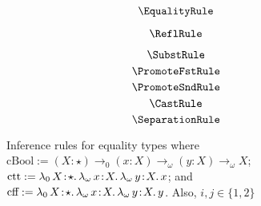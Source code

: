 
\begin{figure}
    \centering
    \begin{minipage}{0.5\textwidth}
        $$\EqualityRule$$
    \end{minipage}%
    \begin{minipage}{0.5\textwidth}
        $$\ReflRule$$
    \end{minipage}%
    $$\SubstRule$$
    $$\PromoteFstRule$$
    $$\PromoteSndRule$$
    $$\CastRule$$
    $$\SeparationRule$$
    \caption{
        Inference rules for equality types where
        $\text{cBool} := (X : \star) \to_0 (x : X) \to_\omega (y : X) \to_\omega X$;
        $\text{ctt} := \abs{\lambda_0}{X}{\star}{
            \abs{\lambda_\omega}{x}{X}{
                \abs{\lambda_\omega}{y}{X}{x}
            }
        }$;
        and
        $\text{cff} := \abs{\lambda_0}{X}{\star}{
            \abs{\lambda_\omega}{x}{X}{
                \abs{\lambda_\omega}{y}{X}{y}
            }
        }$.
        Also, $i, j \in \{ 1, 2 \}$
    }
\end{figure}
